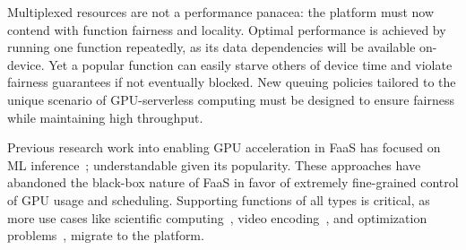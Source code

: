 \begin{comment}
Machines used to host FaaS systems are expected to serve thousands of unique functions with low latency.
This is accomplished by running user function code inside a container (or VM), then keeping the container in memory but idle for future uses. 
A na\"ive adaption of this to the GPU problem would assign an entire GPU to each container for its lifetime.
Unfortunately an idle container then wastes GPU resources, and the limited number of GPUs per server leads to churn when we need to create a new container for another function.
Virtualization for these devices exists, provisioning fixed slices of GPU resources to containers that they then have exclusive access to.
While allowing more containers to exist concurrently, this solution does not address idleness and introduces a new limitation by reducing the maximum allocation any single function is allowed to make.
\end{comment}
  
Multiplexed resources are not a performance panacea: the platform must now contend with function fairness and locality.
Optimal performance is achieved by running one function repeatedly, as its data dependencies will be available on-device.
Yet a popular function can easily starve others of device time and violate fairness guarantees if not eventually blocked.
New queuing policies tailored to the unique scenario of GPU-serverless computing must be designed to ensure fairness while maintaining high throughput.

Previous research work into enabling GPU acceleration in FaaS has focused on ML inference~\cite{pemberton2022kernel, ng2023paella, fingler2022dgsf, gu2023fast}; understandable given its popularity.
These approaches have abandoned the black-box nature of FaaS in favor of extremely fine-grained control of GPU usage and scheduling.
Supporting functions of all types is critical, as more use cases like scientific computing~\cite{kumanov2018serverless,hung2019rapid}, video encoding~\cite{ao2018sprocket, zhang2019video}, and optimization problems~\cite{aytekin2019harnessing,werner2018serverless,shankar2020serverless}, migrate to the platform.

